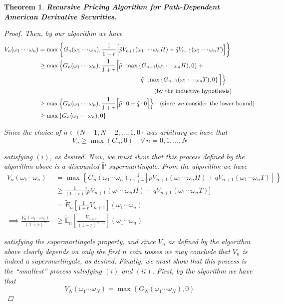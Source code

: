 \documentclass[12pt]{article}
\newtheorem{theorem}{Theorem}
\renewcommand{\P}{\mathbb P}
\newcommand{\E}{\mathbb E}
\begin{document}
\begin{theorem} {\bf Recursive Pricing Algorithm for Path-Dependent American Derivative Securities.}
\begin{proof}
Then, by our algorithm we have
\begin{align*}
	V_n(\omega_1\cdots\omega_n) &= \max \left\{ G_n(\omega_1\cdots\omega_n), \frac{1}{1 + r}\Big[ \tilde{p}V_{n + 1}(\omega_1\cdots\omega_nH) + \tilde{q} V_{n + 1}(\omega_1\cdots\omega_nT) \Big]\right\} \\
	&\geq \max \Big\{ G_n(\omega_1\cdots\omega_n), \frac{1}{1 + r}\Big[ \tilde{p}\cdot \max\left\{G_{n + 1}(\omega_1\cdots\omega_nH), 0\right\} + \\
	&\hphantom{{}={----------------}} \tilde{q}\cdot \max \left\{ G_{n + 1}(\omega_1\cdots\omega_nT), 0\right\} \Big]\Big\} \\
	&\hphantom{{}={-----------------}} \quad \text{(by the inductive hypothesis)} \\
	&\geq \max \Big\{ G_n(\omega_1\cdots\omega_n), \frac{1}{1 + r}\Big[\tilde{p}\cdot 0 + \tilde{q}\cdot 0 \Big] \Big\} \quad \text{(since we consider the lower bound)} \\
	&\geq \max \left\{ G_n(\omega_1\cdots\omega_n), 0 \right\}
\end{align*}

Since the choice of $n \in \{N - 1,N - 2,..., 1, 0\}$ was arbitrary we have that 
\begin{equation*}
	V_n \geq \max(G_n, 0) \quad \forall\,n = 0,1,..., N
\end{equation*}

satisfying $(i)$, as desired. Now, we must show that this process defined by the algorithm above is a discounted $\tilde{\P}$-supermartingale. From the algorithm we have 
\begin{align*}
	V_n(\omega_1\cdots\omega_n) &= \max \left\{ G_n(\omega_1\cdots\omega_n), \frac{1}{1 + r}\left[ \tilde{p}V_{n + 1}(\omega_1\cdots\omega_nH) + \tilde{q}V_{n + 1}(\omega_1\cdots\omega_nT) \right]\right\} \\
	&\geq \frac{1}{(1 + r)}\Big[ \tilde{p}V_{n + 1}(\omega_1\cdots\omega_n H) + \tilde{q}V_{n + 1}(\omega_1\cdots\omega_n T) \Big] \\
	&= \tilde{E}_n \left[ \frac{1}{1 + r}V_{n + 1}\right](\omega_1\cdots\omega_n) \\
	\implies \frac{V_n(\omega_1\cdots\omega_n)}{(1 + r)^n} &\geq \tilde{\E}_n \left[ \frac{V_{n + 1}}{(1 + r)^{n + 1}} \right](\omega_1\cdots\omega_n)
\end{align*}

satisfying the supermartingale property, and since $V_n$ as defined by the algorithm above clearly depends on only the first $n$ coin tosses we may conclude that $V_n$ is indeed a supermartingale, as desired. Finally, we must show that this process is the ``smallest'' process satisfying $(i)$ and $(ii)$. First, by the algorithm we have that
\begin{equation*}
	V_N(\omega_1\cdots\omega_N) = \max \left\{ G_N(\omega_1\cdots\omega_N), 0\right\} 
\end{equation*}


\end{proof}
\end{theorem}
\end{document}
